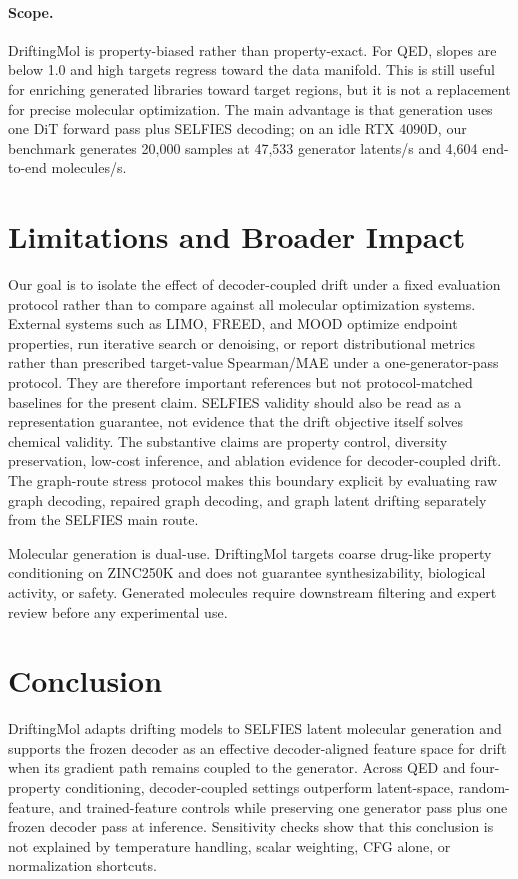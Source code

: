 \documentclass[letterpaper]{article}
\begin{document}
\paragraph{Scope.}
DriftingMol is property-biased rather than property-exact. For QED, slopes are
below 1.0 and high targets regress toward the data manifold. This is still
useful for enriching generated libraries toward target regions, but it is not a
replacement for precise molecular optimization. The main advantage is that
generation uses one DiT forward pass plus SELFIES decoding; on an idle RTX
4090D, our benchmark generates 20,000 samples at 47,533 generator
latents/s and 4,604 end-to-end molecules/s.

\section{Limitations and Broader Impact}

Our goal is to isolate the effect of decoder-coupled drift under a fixed
evaluation protocol rather than to compare against all molecular optimization
systems.
External systems such as LIMO, FREED, and MOOD optimize endpoint
properties, run iterative search or denoising, or report distributional metrics
rather than prescribed target-value Spearman/MAE under a one-generator-pass protocol.
They are therefore important references but not protocol-matched baselines for
the present claim. SELFIES validity should also be read as a representation
guarantee, not evidence that the drift objective itself solves chemical
validity. The substantive claims are property control, diversity preservation,
low-cost inference, and ablation evidence for decoder-coupled drift. The
graph-route stress protocol makes this boundary explicit by evaluating raw
graph decoding, repaired graph decoding, and graph latent drifting separately
from the SELFIES main route.

Molecular generation is dual-use. DriftingMol targets coarse drug-like property
conditioning on ZINC250K and does not guarantee synthesizability, biological
activity, or safety. Generated molecules require downstream filtering and
expert review before any experimental use.

\section{Conclusion}

DriftingMol adapts drifting models to SELFIES latent molecular generation and
supports the frozen decoder as an effective decoder-aligned feature space for
drift when its gradient path remains coupled to the generator. Across QED and
four-property conditioning, decoder-coupled settings outperform latent-space,
random-feature, and trained-feature controls while preserving one generator
pass plus one frozen decoder pass at inference. Sensitivity checks show that
this conclusion is not explained by
temperature handling, scalar weighting, CFG alone, or normalization
shortcuts.


\end{document}
